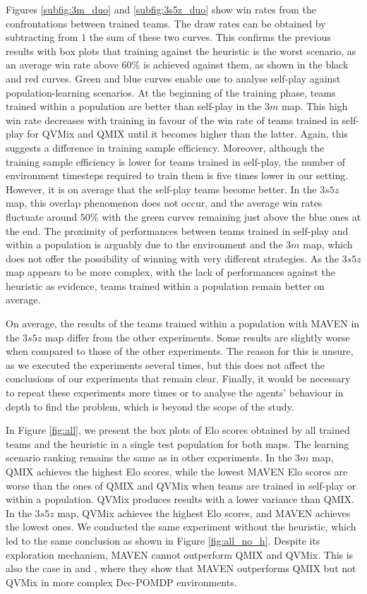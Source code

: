 Figures \ref{subfig:3m_duo} and \ref{subfig:3s5z_duo} show win rates from the confrontations between trained teams.
The draw rates can be obtained by subtracting from $1$ the sum of these two curves.
This confirms the previous results with box plots that training against the heuristic is the worst scenario, as an average win rate above $60\%$ is achieved against them, as shown in the black and red curves.
Green and blue curves enable one to analyse self-play against population-learning scenarios.
At the beginning of the training phase, teams trained within a population are better than self-play in the $3m$ map.
This high win rate decreases with training in favour of the win rate of teams trained in self-play for QVMix and QMIX until it becomes higher than the latter.
Again, this suggests a difference in training sample efficiency.
Moreover, although the training sample efficiency is lower for teams trained in self-play, the number of environment timesteps required to train them is five times lower in our setting.
However, it is on average that the self-play teams become better.
In the $3s5z$ map, this overlap phenomenon does not occur, and the average win rates fluctuate around $50\%$ with the green curves remaining just above the blue ones at the end.
The proximity of performances between teams trained in self-play and within a population is arguably due to the environment and the $3m$ map, which does not offer the possibility of winning with very different strategies.
As the $3s5z$ map appears to be more complex, with the lack of performances against the heuristic as evidence, teams trained within a population remain better on average.

On average, the results of the teams trained within a population with MAVEN in the $3s5z$ map differ from the other experiments. 
Some results are slightly worse when compared to those of the other experiments.
The reason for this is unsure, as we executed the experiments several times, but this does not affect the conclusions of our experiments that remain clear.
Finally, it would be necessary to repeat these experiments more times or to analyse the agents' behaviour in depth to find the problem, which is beyond the scope of the study. 

In Figure \ref{fig:all}, we present the box plots of Elo scores obtained by all trained teams and the heuristic in a single test population for both maps.
The learning scenario ranking remains the same as in other experiments.
In the $3m$ map, QMIX achieves the highest Elo scores, while the lowest MAVEN Elo scores are worse than the ones of QMIX and QVMix when teams are trained in self-play or within a population.
QVMix produces results with a lower variance than QMIX.
In the $3s5z$ map, QVMix achieves the highest Elo scores, and MAVEN achieves the lowest ones.
We conducted the same experiment without the heuristic, which led to the same conclusion as shown in Figure \ref{fig:all_no_h}.
Despite its exploration mechanism, MAVEN cannot outperform QMIX and QVMix.
This is also the case in \citep{Mahajan2019MAVEN:Exploration} and \citep{leroy2020qvmix}, where they show that MAVEN outperforms QMIX but not QVMix in more complex Dec-POMDP environments.

